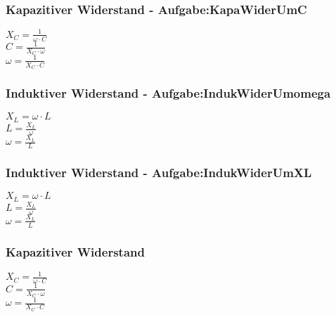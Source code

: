 \subsubsection{Kapazitiver Widerstand - Aufgabe:KapaWiderUmC} 
\begin{minipage}{0.45\textwidth} 
$ X_{C} = \frac{ 1}{\omega \cdot C} $\\ 
$ C = \frac{ 1}{X_{C} \cdot \omega } $\\ 
$ \omega = \frac{ 1}{X_{C} \cdot C} $\\ 
\end{minipage} 
\begin{minipage}{0.45\textwidth} 
 
\end{minipage} 
\subsubsection{Induktiver Widerstand - Aufgabe:IndukWiderUmomega} 
\begin{minipage}{0.45\textwidth} 
$ X_{L} =\omega \cdot L $\\ 
$ L = \frac{X_{L} }{\omega } $\\ 
$ \omega =\frac{X_{L} }{L} $\\ 
\end{minipage} 
\begin{minipage}{0.45\textwidth} 
 
\end{minipage} 
\subsubsection{Induktiver Widerstand - Aufgabe:IndukWiderUmXL} 
\begin{minipage}{0.45\textwidth} 
$ X_{L} =\omega \cdot L $\\ 
$ L = \frac{X_{L} }{\omega } $\\ 
$ \omega =\frac{X_{L} }{L} $\\ 
\end{minipage} 
\begin{minipage}{0.45\textwidth} 
 
\end{minipage} 
\subsubsection{Kapazitiver Widerstand} 
\begin{minipage}{0.45\textwidth} 
$ X_{C} = \frac{ 1}{\omega \cdot C} $\\ 
$ C = \frac{ 1}{X_{C} \cdot \omega } $\\ 
$ \omega = \frac{ 1}{X_{C} \cdot C} $\\ 
\end{minipage} 
\begin{minipage}{0.45\textwidth} 
 
\end{minipage} 
